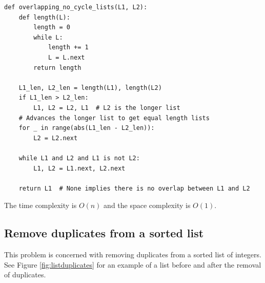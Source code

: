 \documentclass[11pt,a4paper]{article}
\begin{document}
\begin{verbatim}
def overlapping_no_cycle_lists(L1, L2):
    def length(L):
        length = 0 
        while L:
            length += 1
            L = L.next 
        return length

    L1_len, L2_len = length(L1), length(L2) 
    if L1_len > L2_len:
        L1, L2 = L2, L1  # L2 is the longer list
    # Advances the longer list to get equal length lists 
    for _ in range(abs(L1_len - L2_len)):
        L2 = L2.next

    while L1 and L2 and L1 is not L2: 
        L1, L2 = L1.next, L2.next

    return L1  # None implies there is no overlap between L1 and L2
\end{verbatim}

The time complexity is $O(n)$ and the space complexity is $O(1)$.

\subsection{Remove duplicates from a sorted list}

This problem is concerned with removing duplicates from a sorted list of
integers. See Figure \ref{fig:listduplicates} for an example of a list before
and after the removal of duplicates.
\end{document}
